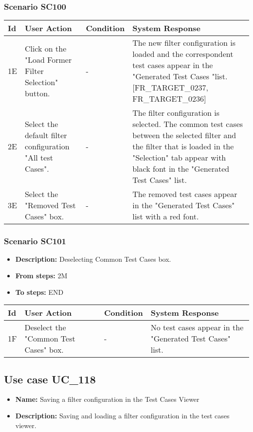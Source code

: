 \documentclass[a4paper,11pt]{article}
\newcommand{\bl}{\\ \hline}
\begin{document}
\subsubsection*{Scenario SC100}
\begin{tabular}{|p{0.4in}|p{1.5in}|p{1.5in}|p{1.5in}|}
\hline
Id & User Action & Condition & System Response \bl 
1E & Click on the "Load Former Filter Selection" button.
					 & - & The new filter configuration is loaded and the
						correspondent test cases appear in the "Generated Test Cases
						"list. [FR_TARGET_0237, FR_TARGET_0236]\bl
2E & Select the default filter configuration "All test Cases".
					 & - & The filter configuration is selected. The common test
						cases between the selected filter and the filter that is loaded in
						the "Selection" tab appear with black font in the "Generated Test
						Cases" list. \bl
3E & Select the "Removed Test Cases" box. & - & The removed test cases appear in the "Generated Test
						Cases" list with a red font.\bl
\end{tabular}
\subsubsection*{Scenario SC101}
\begin{itemize}
\item {\bf Description:} Deselecting Common Test Cases box.
\item {\bf From steps:} 2M
\item {\bf To steps:} END
\end{itemize}
\begin{tabular}{|p{0.4in}|p{1.5in}|p{1.5in}|p{1.5in}|}
\hline
Id & User Action & Condition & System Response \bl 
1F & Deselect the "Common Test Cases" box. & - & No test cases appear in the "Generated Test Cases" list.
					\bl
\end{tabular}
\subsection*{Use case UC_118}
\begin{itemize}
\item {\bf Name: }Saving a filter configuration in the Test Cases Viewer
\item {\bf Description: }Saving and loading a filter configuration in the test
				cases viewer.
\end{itemize}
\end{document}
